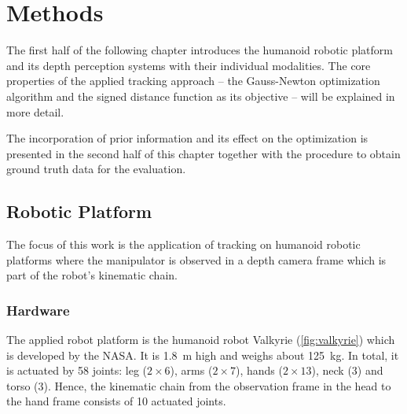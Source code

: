 \chapter{Methods}
\label{sec:methods}

The first half of the following chapter introduces the humanoid robotic platform and its depth perception systems with their individual modalities. The core properties of the applied tracking approach -- the Gauss-Newton optimization algorithm and the signed distance function as its objective -- will be explained in more detail.

The incorporation of prior information and its effect on the optimization is presented in the second half of this chapter together with the procedure to obtain ground truth data for the evaluation.

\section{Robotic Platform}

The focus of this work is the application of tracking on humanoid robotic platforms where the manipulator is observed in a depth camera frame which is part of the robot's kinematic chain.

\subsection{Hardware}

The applied robot platform is the humanoid robot Valkyrie (\cref{fig:valkyrie}) which is developed by the NASA. It is \SI{1.8}{\meter} high and weighs about \SI{125}{\kilo\gram}. In total, it is actuated by 58 joints: leg ($2 \times 6$), arms ($2 \times 7$), hands ($2 \times 13$), neck (3) and torso (3). Hence, the kinematic chain from the observation frame in the head to the hand frame consists of 10 actuated joints.

